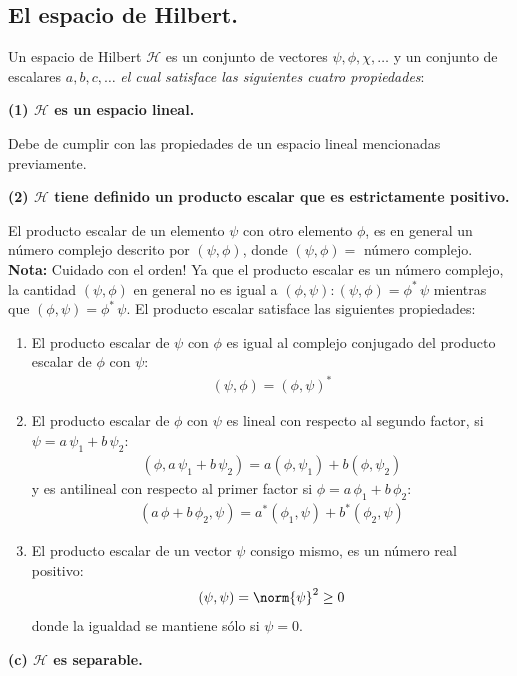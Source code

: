 \subsection{El espacio de Hilbert.}
Un espacio de Hilbert $\mathcal{H}$ es un conjunto de vectores $\psi, \phi, \chi, \ldots$ y un conjunto de escalares $a, b, c, \ldots$ \emph{el cual satisface las siguientes cuatro propiedades}:

\textbf{(1) $\mathcal{H}$ es un espacio lineal.}

Debe de cumplir con las propiedades de un espacio lineal mencionadas previamente.

\textbf{(2) $\mathcal{H}$ tiene definido un producto escalar que es estrictamente positivo.}

El producto escalar de un elemento $\psi$ con otro elemento $\phi$, es en general un número complejo descrito por $(\psi, \phi)$, donde $(\psi, \phi) =$ número complejo. \textbf{Nota: } Cuidado con el orden! Ya que el producto escalar es un número complejo, la cantidad  $(\psi, \phi)$ en general no es igual a  $(\phi, \psi) : (\psi, \phi) = \phi^{*} \, \psi$ mientras que $(\phi, \psi) = \phi^{*} \, \psi$. El producto escalar satisface las siguientes propiedades:
\begin{enumerate}[label=\roman*)]
\item El producto escalar de $\psi$ con $\phi$ es igual al complejo conjugado del producto escalar de $\phi$ con $\psi$:
\begin{align}
(\psi, \phi) = (\phi, \psi)^{*}
\label{eq:ecuacion_02_04}
\end{align}
\item El producto escalar de $\phi$ con $\psi$ es lineal con respecto al segundo factor, si $\psi = a \, \psi_{1} + b \, \psi_{2}$:
\begin{align}
(\phi, a \, \psi_{1} + b \, \psi_{2} ) = a (\phi, \psi_{1}) + b (\phi, \psi_{2})
\label{eq:ecuacion_02_05}
\end{align}
y es antilineal con respecto al primer factor si $\phi = a \, \phi_{1} + b \, \phi_{2}$:
\begin{align}
(a \, \phi + b \, \phi_{2}, \psi) = a^{*} (\phi_{1}, \psi) + b^{*} (\phi_{2}, \psi)
\label{eq:ecuacion_02_06}
\end{align}
\item El producto escalar de un vector $\psi$ consigo mismo, es un número real positivo:
\begin{align}
(\psi, \psi) = \norm{\psi}^{2} \geq 0
\label{eq:ecuacion_02_07}
\end{align}
donde la igualdad se mantiene sólo si $\psi = 0$.
\end{enumerate}
\textbf{(c) $\mathcal{H}$ es separable.}

